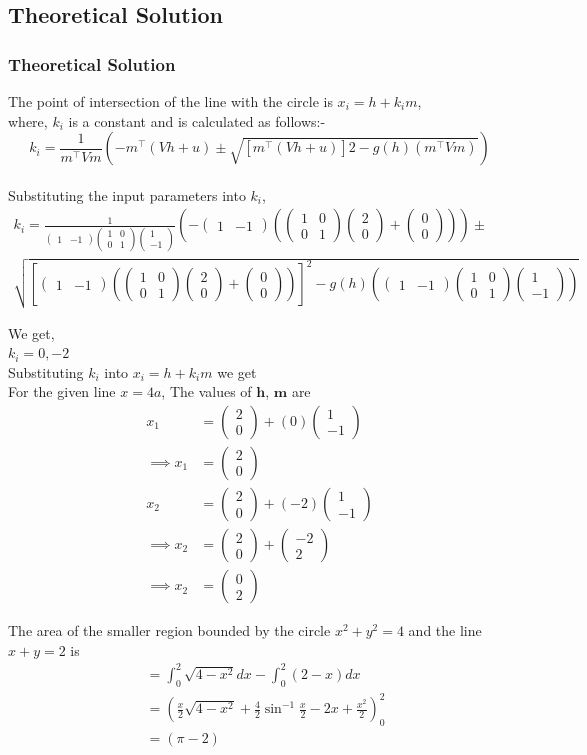 \documentclass{beamer}
\providecommand{\sbrak}[1]{\ensuremath{{}\left[#1\right]}}
\providecommand{\brak}[1]{\ensuremath{\left(#1\right)}}
\theoremstyle{remark}
\newcommand{\myvec}[1]{\ensuremath{\begin{pmatrix}#1\end{pmatrix}}}
\let\vec\mathbf
\numberwithin{equation}{section}
\begin{document}
\subsection{Theoretical Solution}
\begin{frame}
\frametitle{Theoretical Solution}

The point of intersection of the line with the circle is $x_i=h+k_i m$,\\
where, $k_i$ is a constant and is calculated as follows:-
$$k_i=\frac{1}{m^\top Vm}\brak{-m^\top \brak{Vh+u}\pm \sqrt{\sbrak{m^\top \brak{Vh+u}} 2-g\brak{h}\brak{m^\top Vm}}}$$\\
Substituting the input parameters into $k_i$,\\
{\scriptsize
\begin{multline}
     k_i =\frac{1}{\myvec{1 
 & -1}\myvec{1 & 0 \\ 0 & 1}\myvec{1 \\ -1}}\brak{-\myvec{1&-1}\brak{\myvec{1&0\\0&1}\myvec{2\\0}+\myvec{0\\0}}}\pm \\
     \sqrt{\sbrak{\myvec{1&-1}\brak{\myvec{1&0\\0&1}\myvec{2\\0}+\myvec{0\\0}}}^2-g\brak{h}\brak{\myvec{1&-1}\myvec{1&0\\0&1}\myvec{1\\-1}}} 
\end{multline}
}
\end{frame}
\begin{frame}
We get,\\
$k_i= 0,-2$\\
Substituting $k_i$ into $x_i=h+k_i m$ we get\\
    For the given line $x=4a$, The values of $\vec{h}$, $\vec{m}$ are
\begin{align}
     x_1&=\myvec{2\\0}+\brak{0}\myvec{1\\-1}\\
    \implies x_1 &=\myvec{2\\0}\\
    x_2 &=\myvec{2\\0}+\brak{-2}\myvec{1\\-1}\\
    \implies x_2&=\myvec{2\\0}+\myvec{-2\\2}\\
    \implies x_2&=\myvec{0\\2}
\end{align}
\end{frame}
\begin{frame}
    The area of the smaller region bounded by the circle $x^2 + y^2 = 4$ and the line $x + y = 2$ is
\begin{align}
    &=\int_{0}^{2} \sqrt{4-x^2}dx-\int_{0}^{2} \brak{2-x} dx\\
    &=\brak{\frac{x}{2}\sqrt{4-x^2}+\frac{4}{2}\sin^{-1}{\frac{x}{2}}-2x+\frac{x^2}{2}}_{0}^{2}\\
    &=\brak{\pi-2}
\end{align}
\end{frame}
\end{document}
